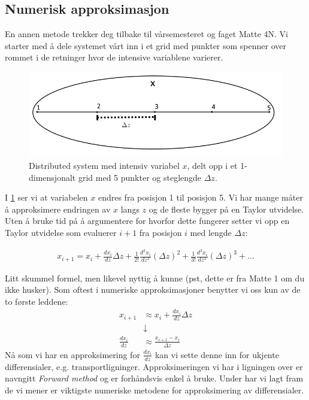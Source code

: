 \subsection{Numerisk approksimasjon}\label{sec:numerisk_approksimasjon}
En annen metode trekker deg tilbake til vårsemesteret og faget Matte 4N. Vi starter med å dele systemet vårt inn i et grid med punkter som spenner over rommet i de retninger hvor de intensive variablene varierer. 
\begin{figure}[H]
    \centering
    \includegraphics[scale=0.5]{Figures/Distributed_discret.png}
    \caption{Distributed system med intensiv variabel $x$, delt opp i et 1-dimensjonalt grid med 5 punkter og steglengde $\Delta z$.}
    \label{fig:distributed_numerisk}
\end{figure}

I \cref{fig:distributed_numerisk} ser vi at variabelen $x$ endres fra posisjon 1 til posisjon 5. Vi har mange måter å approksimere endringen av $x$ langs $z$ og de fleste bygger på en Taylor utvidelse. Uten å bruke tid på å argumentere for hvorfor dette fungerer setter vi opp en Taylor utvidelse som evaluerer $i+1$ fra posisjon $i$ med lengde $\Delta z$:

\begin{align}
    x_{i+1} = x_i + \frac{dx_i}{dz}\Delta z + \frac{1}{2!}\frac{d^2x_i}{dz^2}(\Delta z)^2 + \frac{1}{3!}\frac{d^3x_i}{dz^3}(\Delta z)^3 + \dots
\end{align}

Litt skummel formel, men likevel nyttig å kunne (pst, dette er fra Matte 1 om du ikke husker). Som oftest i numeriske approksimasjoner benytter vi oss kun av de to første leddene:
\begin{align}
    x_{i+1} &\approx x_i + \frac{dx_i}{dz}\Delta z\\
    &\downarrow \\
    \frac{dx_i}{dz} &\approx \frac{x_{i+1}-x_i}{\Delta z}
\end{align}
Nå som vi har en approksimering for $\frac{dx_i}{dz}$ kan vi sette denne inn for ukjente differensialer, e.g. transportligninger. Approksimeringen vi har i ligningen over er navngitt \textit{Forward method} og er forhåndsvis enkel å bruke. Under har vi lagt fram de vi mener er viktigste numeriske metodene for approksimering av differensialer. 

